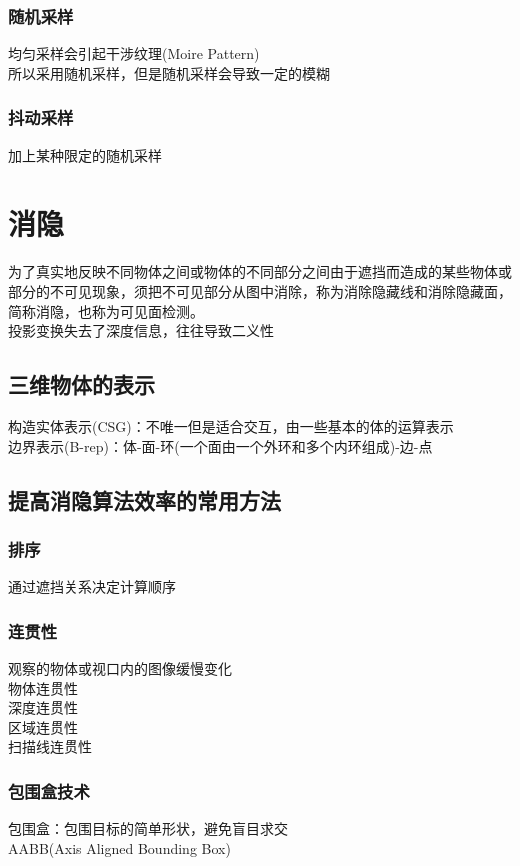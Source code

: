 \documentclass{article}
\begin{document}
\begin{CJK}{UTF8}{gbsn}
	\subsubsection{随机采样}
	均匀采样会引起干涉纹理(Moire Pattern)\\
	所以采用随机采样，但是随机采样会导致一定的模糊\\
	\subsubsection{抖动采样}
	加上某种限定的随机采样\\
	
	\section{消隐}
	为了真实地反映不同物体之间或物体的不同部分之间由于遮挡而造成的某些物体或部分的不可见现象，须把不可见部分从图中消除，称为消除隐藏线和消除隐藏面，简称消隐，也称为可见面检测。\\
	投影变换失去了深度信息，往往导致二义性\\
	
	
	\subsection{三维物体的表示}
	构造实体表示(CSG)：不唯一但是适合交互，由一些基本的体的运算表示\\
	边界表示(B-rep)：体-面-环(一个面由一个外环和多个内环组成)-边-点\\
	\subsection{提高消隐算法效率的常用方法}
	\subsubsection{排序}
	通过遮挡关系决定计算顺序\\
	\subsubsection{连贯性}
	观察的物体或视口内的图像缓慢变化\\
	物体连贯性\\
	深度连贯性\\
	区域连贯性\\
	扫描线连贯性\\
	\subsubsection{包围盒技术}
	包围盒：包围目标的简单形状，避免盲目求交\\
	AABB(Axis Aligned Bounding Box)

\end{CJK}
\end{document}
